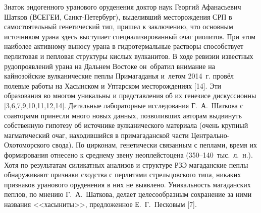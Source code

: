 Знаток эндогенного уранового оруденения доктор наук Георгий Афанасьевич Шатков (ВСЕГЕИ, Санкт-Петербург), выделивший месторождения СРП в самостоятельный генетический тип, пришел к заключению, что основным источником урана здесь выступает специализированный очаг риолитов. При этом наиболее активному выносу урана в гидротермальные растворы способствует перлитовая и пепловая структуры кислых вулканитов. В ходе ревизии известных рудопроявлений урана на Дальнем Востоке он~обратил внимание на кайнозойские вулканические пеплы Примагаданья и~летом 2014~г. провёл полевые работы на Хасынском и Уптарском месторождениях [14]. Эти образования во многом уникальны и представления об их генезисе дискуссионны [3,6,7,9,10,11,12,14]. Детальные лабораторные исследования Г.~А.~Шаткова с соавторами принесли много новых данных, позволивших авторам выдвинуть собственную гипотезу об источнике вулканического материала (очень крупный магматический очаг, находившийся в примагаданской части Центрально-Охотоморского свода). По цирконам, генетически связанным с пеплами, время их формирования отнесено к среднему звену неоплейстоцена (350--140~тыс.~л.~н.). Хотя по результатам силикатных анализов и структуре РЗЭ магаданские пеплы обнаруживают признаки сходства с перлитами стрельцовского типа, никаких признаков уранового оруденения в них не выявлено. Уникальность магаданских пеплов, по мнению Г.~А.~Шаткова, делает целесообразным сохранение за ними названия <<хасыниты>>, предложенное Е.~Г.~Песковым [7].


